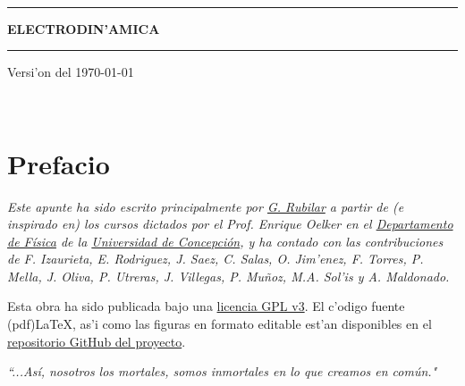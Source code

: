 \documentclass[letterpaper,11pt]{report}
\begin{document}
\sffamily

\thispagestyle{empty}
\begin{center}

\

\vspace{6.5cm}

\rule{15cm}{0.1cm}

\vspace{1.5cm}

{\huge \textsc{\textbf{ELECTRODIN'AMICA}}}

\vspace{1.5cm}

\rule{15cm}{0.1cm}

\vspace{1.5cm}

Versi'on del \today

\end{center}

\newpage
\thispagestyle{empty}
\ \\
\newpage
\setcounter{page}{1}

\pagestyle{plain}
\chapter*{Prefacio}
\bigskip
\bigskip
\bigskip
\bigskip
\bigskip
\bigskip


\emph{Este apunte ha sido escrito principalmente por \href{https://google.com/+GuillermoRubilar}{G. Rubilar} a partir de (e inspirado en) los cursos dictados por el Prof. Enrique Oelker en el \href{http://www.fisica.udec.cl/}{Departamento de F\'isica} de la \href{www.udec.cl}{Universidad de Concepci\'on}, y ha contado con las contribuciones de F. Izaurieta, E. Rodriguez, J. Saez, C. Salas, O. Jim'enez, F. Torres, P. Mella, J. Oliva, P. Utreras, J. Villegas, P. Mu\~noz, M.A. Sol'is y A. Maldonado.}

\bigskip


\bigskip

Esta obra ha sido publicada bajo una \href{https://github.com/gfrubi/electrodinamica/blob/master/LICENSE}{licencia GPL v3}. El c'odigo fuente (pdf)\LaTeX, as'i como las figuras en formato editable est'an disponibles en el \href{https://github.com/gfrubi/electrodinamica}{repositorio GitHub del proyecto}.
\bigskip
\bigskip
\bigskip
\bigskip
\bigskip
\bigskip



\emph{\textquotedblleft ...As\'i, nosotros los mortales, somos
inmortales en lo que creamos en com\'un."}
\end{document}
